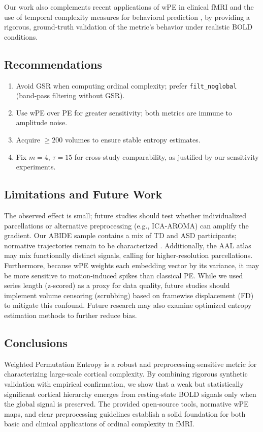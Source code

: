 \documentclass[12pt,a4paper]{article}
\begin{document}
	Our work also complements recent applications of wPE in clinical fMRI \cite{liu2024wpe} and the use of temporal complexity measures for behavioral prediction \cite{omidvarnia2024}, by providing a rigorous, ground‑truth validation of the metric's behavior under realistic BOLD conditions.
	
	\subsection{Recommendations}
	\begin{enumerate}[label=(\roman*)]
		\item Avoid GSR when computing ordinal complexity; prefer \texttt{filt\_noglobal} (band‑pass filtering without GSR).
		\item Use wPE over PE for greater sensitivity; both metrics are immune to amplitude noise.
		\item Acquire $\geq 200$ volumes to ensure stable entropy estimates.
		\item Fix $m=4$, $\tau=15$ for cross‑study comparability, as justified by our sensitivity experiments.
	\end{enumerate}
	
	\subsection{Limitations and Future Work}
	The observed effect is small; future studies should test whether individualized parcellations or alternative preprocessing (e.g., ICA‑AROMA) can amplify the gradient. Our ABIDE sample contains a mix of TD and ASD participants; normative trajectories remain to be characterized \cite{niu2022}. Additionally, the AAL atlas may mix functionally distinct signals, calling for higher‑resolution parcellations. Furthermore, because wPE weights each embedding vector by its variance, it may be more sensitive to motion‑induced spikes than classical PE. While we used series length (z‑scored) as a proxy for data quality, future studies should implement volume censoring (scrubbing) based on framewise displacement (FD) to mitigate this confound. Future research may also examine optimized entropy estimation methods \cite{roediger2024} to further reduce bias.
	
	\subsection{Conclusions}
	Weighted Permutation Entropy is a robust and preprocessing‑sensitive metric for characterizing large‑scale cortical complexity. By combining rigorous synthetic validation with empirical confirmation, we show that a weak but statistically significant cortical hierarchy emerges from resting‑state BOLD signals only when the global signal is preserved. The provided open‑source tools, normative wPE maps, and clear preprocessing guidelines establish a solid foundation for both basic and clinical applications of ordinal complexity in fMRI.
	
\end{document}
